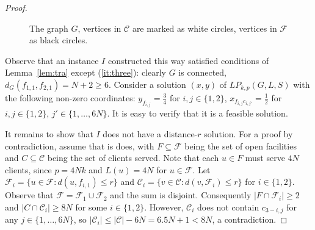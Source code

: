 \documentclass{article}
\newcommand{\F}{\mathcal{F}}
\newcommand{\C}{\mathcal{C}}
\newcommand{\sub}{\subseteq}
\theoremstyle{plain}
\theoremstyle{definition}
\begin{document}
\begin{proof}
\begin{figure}
\begin{center}
\end{center}
\caption{\label{fig:ex}
The graph $G$, vertices in $\C$ are marked as white circles, vertices in $\F$ as black circles.}

\end{figure}
 Observe that an instance $I$ constructed this way satisfied conditions of Lemma~\ref{lem:tra} except (\ref{it:three}):
clearly $G$ is connected, $d_G(f_{1,1},f_{2,1})=N+2 \ge 6$. Consider a solution $(x,y)$ of $LP_{k,p}(G,L,S)$ with the following
non-zero coordinates: $y_{f_{i,j}}=\frac{3}{4}$ for $i,j\in\{1,2\}$, $x_{f_{i,j}c_{i,j'}}=\frac{1}{2}$ for $i,j\in\{1,2\}$, $j'\in\{1,\ldots,6N\}$.
It is easy to verify that it is a feasible solution.

It remains to show that $I$ does not have a distance-$r$ solution.
For a proof by contradiction, assume that is does, with $F\sub \F$ being the set of open facilities and $C\sub \C$
being the set of clients served.
Note that each $u\in F$ must serve $4N$ clients, since $p=4Nk$ and $L(u)=4N$ for $u\in \F$.
Let $\F_i = \{u\in \F : d(u,f_{i,1})\le r\}$ and $\C_i = \{v \in \C : d(v, \F_i)\le r\}$ for $i\in\{1,2\}$.
Observe that $\F=\F_1\cup \F_2$ and the sum is disjoint. Consequently $|F\cap \F_i| \ge 2$ and  $|C\cap \C_i|\ge 8N$ for some $i\in\{1,2\}$.
However, $\C_i$ does not contain $c_{3-i,j}$ for any $j\in\{1,\ldots,6N\}$, so $|\C_i|\le |\C|-6N=6.5N+1<8N$, a contradiction.
\end{proof}
\end{document}
